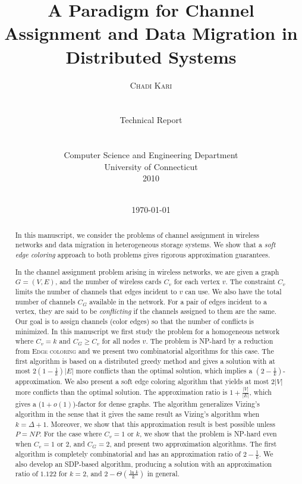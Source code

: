 \documentclass[titlepage, 11pt]{article}
\title{ A Paradigm for Channel Assignment  and Data Migration  in Distributed Systems}
\author{\textsc{Chadi Kari}\\ \\ 
\\Technical Report
\\
\\
\\
Computer Science and Engineering Department \\ University of Connecticut\\
2010
\date{}
\\}
\date{\today}
\begin{document}
\maketitle

\begin{abstract}
In this manuscript, we consider the problems of channel assignment in wireless networks and data migration in heterogeneous storage systems. We show that a  \emph{soft edge coloring} approach to both problems  gives rigorous approximation guarantees. 

In the channel assignment problem arising in wireless networks, we are given a graph $G = (V, E)$, and the number of wireless cards $C_v$ for each vertex $v$. The constraint $C_v$ limits the number
of channels that edges incident to $v$ can use. We also have the total number of channels $C_G$ available in the network. For a pair of edges incident to a vertex, they are said to be {\em conflicting}
if the channels assigned to them are the same. Our goal is to assign channels (color edges) so that
the number of conflicts is minimized. In this manuscript we  first study the problem for a homogeneous network where $C_v = k$ and $C_G \ge C_v$ for all nodes $v$.  The problem is NP-hard by a reduction from \textsc{Edge coloring} and
we present two combinatorial algorithms for this case.
The first algorithm is based on a distributed greedy method and 
gives a solution with at most $2(1-\frac{1}{k})|E|$ more conflicts than the optimal solution,
which implies a $(2 - \frac{1}{k})$-approximation. 
We also present a soft edge coloring algorithm that  yields at most $2|V|$ more conflicts than the optimal solution.  The approximation ratio is $1 + \frac{|V|}{|E|}$, which gives a ($1 + o(1)$)-factor for dense graphs.  The algorithm generalizes Vizing's algorithm in the sense that it gives the same result as Vizing's algorithm when $k = \Delta + 1$. Moreover, we show that this approximation result is best possible unless $P = NP$. For the case where $C_v = 1$ or $k$,
we show that the problem is NP-hard even when $C_v = 1$ or $2$, and $C_G = 2$, and present two approximation algorithms. The first algorithm is completely combinatorial and has an approximation ratio of $2-\frac{1}{k}$.  We also develop an SDP-based algorithm, producing a solution with an approximation ratio of $1.122$ for $k = 2$, and $2-\Theta(\frac{\ln k}{k})$ in general.
   

\end{abstract}
\end{document}
